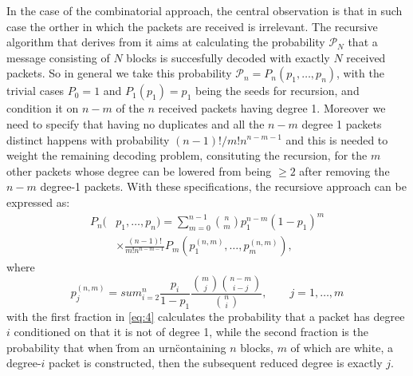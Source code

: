 In the case of the combinatorial approach, the central observation is that in such case the orther in which the packets are received is irrelevant. The recursive algorithm that derives from it aims at calculating the probability $\mathcal{P}_N$ that a message consisting of $N$ blocks is succesfully decoded with exactly $N$ received packets. So in general we take this probability $\mathcal{P}_n = P_n(p_1,\dots,p_n)$, with the trivial cases $P_0=1$ and $P_1(p_1) = p_1$ being the seeds for recursion, and condition it on $n-m$ of the $n$ received packets having degree 1. Moreover we need to specify that having no duplicates and all the $n-m$ degree 1 packets distinct happens with probability $(n-1)!/m!n^{n-m-1}$ and this is needed to weight the remaining decoding problem, consituting the recursion, for the $m$ other packets whose degree can be lowered from being $\geq 2$ after removing the $n-m$ degree-1 packets. With these specifications, the recursiove approach can be expressed as:
\begin{align}
    P_n(&p_1,\dots,p_n) = \sum_{m=0}^{n-1}\binom{n}{m}p_1^{n-m}(1-p_1)^m\\
    &\times\frac{(n-1)!}{m!n^{n-m-1}}P_m(p_1^{(n,m)},\dots,p_m^{(n,m)}),
    \label{eq:3}
\end{align}
where
\begin{equation}
  p_j^{(n,m)} = sum_{i=2}^{n}\frac{p_i}{1-p_1}\frac{\binom{m}{j}\binom{n-m}{i-j}}{\binom{n}{i}}, \qquad j = 1,\dots,m
  \label{eq:4}
\end{equation}
with the first fraction in \ref{eq:4} calculates the probability that a packet has degree $i$ conditioned on that it is not of degree 1, while the second fraction is the probability that when \"from an urn\" containing $n$ blocks, $m$ of which are white, a degree-$i$ packet is constructed, then the subsequent reduced degree is exactly $j$.




